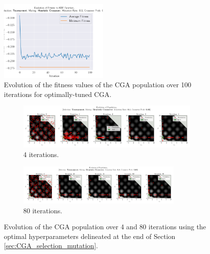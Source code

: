 \documentclass[10pt]{article}
\begin{document}
\begin{multicols}{2}
\begin{figure}[H]
    \centering
    \includegraphics[width=0.48\textwidth]{../figures/Permanent Images/0.1_0.65_Fitness.png}
    \captionsetup{justification=centering}
    \caption{Evolution of the fitness values of the CGA population over 100 iterations for optimally-tuned CGA.}
    \label{fig:CGA_fitness_evo_OPT}
\end{figure}
\end{multicols}
\begin{figure}[H]
    \centering
    \begin{subfigure}{0.9\textwidth}
        \centering
        \includegraphics[width=\textwidth]{../figures/Permanent Images/0.1_0.65_Population.png}
        \caption{4 iterations.}
        \label{fig:optimal_5}
    \end{subfigure}
    \begin{subfigure}{\textwidth}
        \centering
        \includegraphics[width=0.9\textwidth]{../figures/Permanent Images/0.1_0.65_Population100.png}
        \caption{80 iterations.}
        \label{fig:optimat_100}
    \end{subfigure}
    \captionsetup{justification=centering}
    \caption{Evolution of the CGA population over 4 and 80 iterations using the optimal hyperparameters delineated at the end of Section \ref{sec:CGA_selection_mutation}.}
    \label{fig:optimal_convergence}
\end{figure}
\end{document}
